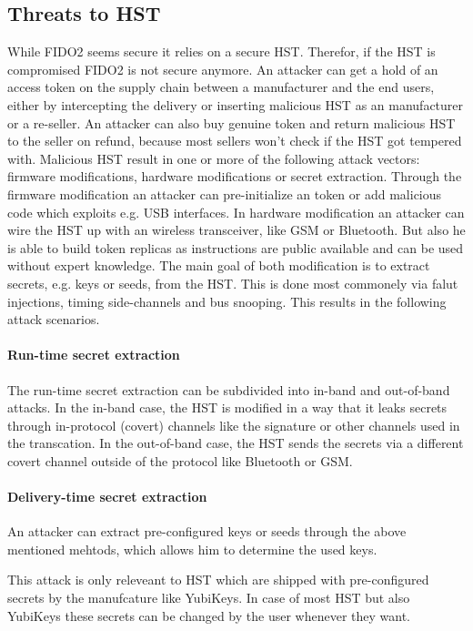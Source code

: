 \documentclass[runningheads]{llncs}
\begin{document}
\subsection{Threats to HST}
While FIDO2 seems secure it relies on a secure HST. Therefor, if the HST is compromised FIDO2 is not secure anymore. An attacker can get a hold of an access token on the supply chain between a manufacturer and the end users, either by intercepting the delivery or inserting malicious HST as an manufacturer or a re-seller. An attacker can also buy genuine token and return malicious HST to the seller on refund, because most sellers won't check if the HST got tempered with. Malicious HST result in one or more of the following attack vectors: firmware modifications, hardware modifications or secret extraction. Through the firmware modification an attacker can pre-initialize an token or add malicious code which exploits e.g. USB interfaces. In hardware modification an attacker can wire the HST up with an wireless transceiver, like GSM or Bluetooth. But also he is able to build token replicas as instructions are public available and can be used without expert knowledge. The main goal of both modification is to extract secrets, e.g. keys or seeds, from the HST. This is done most commonely via falut injections, timing side-channels and bus snooping. \cite{272198} This results in the following attack scenarios.

\paragraph{Run-time secret extraction}
The run-time secret extraction can be subdivided into in-band and out-of-band attacks. In the in-band case, the HST is modified in a way that it leaks secrets through in-protocol (covert) channels like the signature or other channels used in the transcation. In the out-of-band case, the HST sends the secrets via a different covert channel outside of the protocol like Bluetooth or GSM. 

\paragraph{Delivery-time secret extraction}
An attacker can extract pre-configured keys or seeds through the above mentioned mehtods, which allows him to determine the used keys.

This attack is only releveant to HST which are shipped with pre-configured secrets by the manufcature like YubiKeys. In case of most HST but also YubiKeys these secrets can be changed by the user whenever they want.
\end{document}

